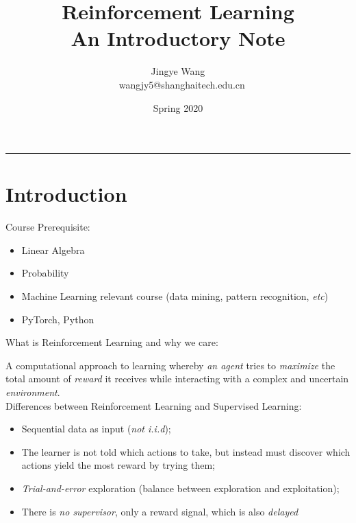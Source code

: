 \documentclass{progartcn}
\title{\bfseries\sffamily 
  Reinforcement Learning \\ %
  \normalfont\zihao{-3}
    \textbf{An Introductory Note}%
}
\author{Jingye Wang \\ \faEnvelope~ wangjy5@shanghaitech.edu.cn}  %
\date{Spring 2020}
\begin{document}
\sloppy %


\maketitle
\thispagestyle{empty}
\renewcommand{\refname}{References}
\renewcommand{\contentsname}{Contents}

\begin{comment}
\noindent\rule[0.25\baselineskip]{\textwidth}{1pt}

	The framework of this note is enlightened by \textit{SI-252}~\cite{si252}, while the contents mainly derived from not only \textit{SI-252} but also \textit{Intro to Reinforcement Learning, Bolei Zhou}~\cite{introRL}, \textit{Reinforcement Learning, David Silver}~\cite{ucl_rl}, \textit{etc}. Many thanks to these great works!
\end{comment}

\noindent\rule[0.25\baselineskip]{\textwidth}{1pt}


\setcounter{tocdepth}{2}
\setcounter{secnumdepth}{4}
\tableofcontents

\pagebreak

\section{Introduction}

	Course Prerequisite:
	\begin{itemize}[noitemsep,topsep=0pt]
		\item Linear Algebra
		\item Probability
		\item Machine Learning relevant course (data mining, pattern recognition, \textit{etc})
		\item PyTorch, Python\\
	\end{itemize}

	What is Reinforcement Learning and why we care:

	A computational approach to learning whereby \textit{an agent} tries to \textit{maximize} the total amount of \textit{reward} it receives while interacting with a complex and uncertain \textit{environment}.\cite{sutton2018reinforcement}\\

	Differences between Reinforcement Learning and Supervised Learning:
	\begin{itemize}[noitemsep,topsep=0pt]
		\item Sequential data as input (\textit{not i.i.d});
		\item The learner is not told which actions to take, but instead must discover which actions yield the most reward by trying them;
		\item \textit{Trial-and-error} exploration (balance between exploration and exploitation);
		\item There is \textit{no supervisor}, only a reward signal, which is also \textit{delayed}\\
	\end{itemize}
\end{document}
